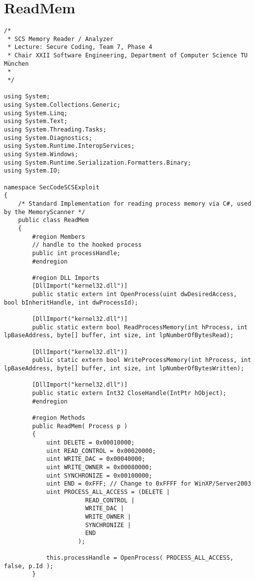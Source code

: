 \section{ReadMem}

\begin{lstlisting}
/*
 * SCS Memory Reader / Analyzer
 * Lecture: Secure Coding, Team 7, Phase 4
 * Chair XXII Software Engineering, Department of Computer Science TU München
 *
 */

using System;
using System.Collections.Generic;
using System.Linq;
using System.Text;
using System.Threading.Tasks;
using System.Diagnostics;
using System.Runtime.InteropServices;
using System.Windows;
using System.Runtime.Serialization.Formatters.Binary;
using System.IO;

namespace SecCodeSCSExploit
{
    /* Standard Implementation for reading process memory via C#, used by the MemoryScanner */
    public class ReadMem
    {
        #region Members
        // handle to the hooked process
        public int processHandle;
        #endregion

        #region DLL Imports
        [DllImport("kernel32.dll")]
        public static extern int OpenProcess(uint dwDesiredAccess, bool bInheritHandle, int dwProcessId);

        [DllImport("kernel32.dll")]
        public static extern bool ReadProcessMemory(int hProcess, int lpBaseAddress, byte[] buffer, int size, int lpNumberOfBytesRead);

        [DllImport("kernel32.dll")]
        public static extern bool WriteProcessMemory(int hProcess, int lpBaseAddress, byte[] buffer, int size, int lpNumberOfBytesWritten);

        [DllImport("kernel32.dll")]
        public static extern Int32 CloseHandle(IntPtr hObject);
        #endregion

        #region Methods
        public ReadMem( Process p )
        {
            uint DELETE = 0x00010000;
            uint READ_CONTROL = 0x00020000;
            uint WRITE_DAC = 0x00040000;
            uint WRITE_OWNER = 0x00080000;
            uint SYNCHRONIZE = 0x00100000;
            uint END = 0xFFF; // Change to 0xFFFF for WinXP/Server2003
            uint PROCESS_ALL_ACCESS = (DELETE |
                       READ_CONTROL |
                       WRITE_DAC |
                       WRITE_OWNER |
                       SYNCHRONIZE |
                       END
                     );

            this.processHandle = OpenProcess( PROCESS_ALL_ACCESS, false, p.Id );
        }


\end{lstlisting}
